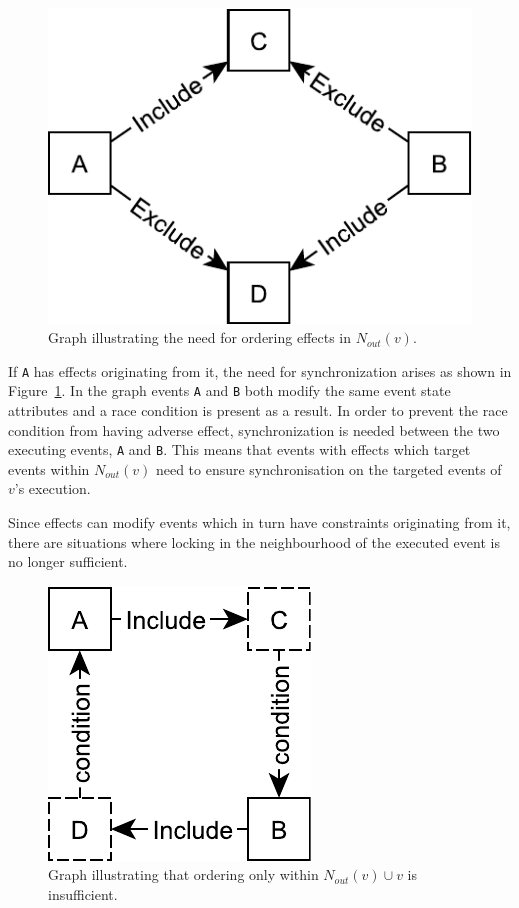 \documentclass{article}
\begin{document}
	\begin{figure}[ht!]
		\center
		\includegraphics[scale=0.5]{figures/dcr-graphs/race-condition.pdf}
		\caption{Graph illustrating the need for ordering effects in $N_{out}(v)$.}
		\label{fig:race-condition}
	\end{figure}

	If \texttt{A} has effects originating from it, the need for synchronization arises as shown in Figure~\ref{fig:race-condition}.
	In the graph events \texttt{A} and \texttt{B} both modify the same event state attributes and a race condition is present as a result.
	In order to prevent the race condition from having adverse effect, synchronization is needed between the two executing events, \texttt{A} and \texttt{B}.
	This means that events with effects which target events within $N_{out}(v)$ need to ensure synchronisation on the targeted events of $v$'s execution.

	Since effects can modify events which in turn have constraints originating from it, there are situations where locking in the neighbourhood of the executed event is no longer sufficient.

	\begin{figure}[ht!]
		\center
		\includegraphics[scale=0.5]{figures/dcr-graphs/second-degree-effect.pdf}
		\caption{Graph illustrating that ordering only within $N_{out}(v) \cup v$ is insufficient.}
		\label{fig:second-degree-effect}
	\end{figure}
\end{document}
